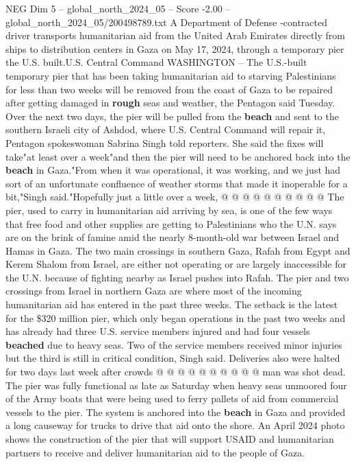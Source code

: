\begin{textsample}{NEG Dim 5 – global\_north\_2024\_05 – Score -2.00 – global\_north\_2024\_05/200498789.txt}  \label{ex:f5_neg_282}
A Department of Defense -contracted driver transports humanitarian aid from the United Arab Emirates directly from ships to distribution centers in Gaza on May 17, 2024, through a temporary pier the U.S. built.U.S.
Central Command WASHINGTON -- The U.S.-built temporary pier that has been taking humanitarian aid to starving Palestinians for less than two weeks will be removed from the coast of Gaza to be repaired after getting damaged in \textbf{rough} seas and weather, the Pentagon said Tuesday.
Over the next two days, the pier will be pulled from the \textbf{beach} and sent to the southern Israeli city of Ashdod, where U.S.
Central Command will repair it, Pentagon spokeswoman Sabrina Singh told reporters.
She said the fixes will take"at least over a week"and then the pier will need to be anchored back into the \textbf{beach} in Gaza."From when it was operational, it was working, and we just had sort of an unfortunate confluence of weather storms that made it inoperable for a bit,"Singh said."Hopefully just a little over a week, @ @ @ @ @ @ @ @ @ @ The pier, used to carry in humanitarian aid arriving by sea, is one of the few ways that free food and other supplies are getting to Palestinians who the U.N. says are on the brink of famine amid the nearly 8-month-old war between Israel and Hamas in Gaza.
The two main crossings in southern Gaza, Rafah from Egypt and Kerem Shalom from Israel, are either not operating or are largely inaccessible for the U.N. because of fighting nearby as Israel pushes into Rafah.
The pier and two crossings from Israel in northern Gaza are where most of the incoming humanitarian aid has entered in the past three weeks.
The setback is the latest for the \$320 million pier, which only began operations in the past two weeks and has already had three U.S. service members injured and had four vessels \textbf{beached} due to heavy seas.
Two of the service members received minor injuries but the third is still in critical condition, Singh said.
Deliveries also were halted for two days last week after crowds @ @ @ @ @ @ @ @ @ @ man was shot dead.
The pier was fully functional as late as Saturday when heavy seas unmoored four of the Army boats that were being used to ferry pallets of aid from commercial vessels to the pier.
The system is anchored into the \textbf{beach} in Gaza and provided a long causeway for trucks to drive that aid onto the shore.
An April 2024 photo shows the construction of the pier that will support USAID and humanitarian partners to receive and deliver humanitarian aid to the people of Gaza.

\end{textsample}
